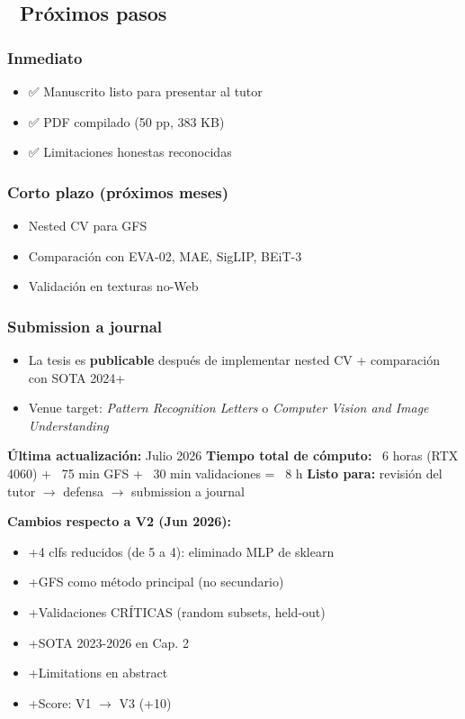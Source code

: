 \hrulefill

\subsection{📅 Próximos pasos}

\subsubsection{Inmediato}
\begin{itemize}
  \item ✅ Manuscrito listo para presentar al tutor
  \item ✅ PDF compilado (50 pp, 383 KB)
  \item ✅ Limitaciones honestas reconocidas
\end{itemize}

\subsubsection{Corto plazo (próximos meses)}
\begin{itemize}
  \item Nested CV para GFS
  \item Comparación con EVA-02, MAE, SigLIP, BEiT-3
  \item Validación en texturas no-Web
\end{itemize}

\subsubsection{Submission a journal}
\begin{itemize}
  \item La tesis es \textbf{publicable} después de implementar nested CV + comparación con SOTA 2024+
  \item Venue target: \textit{Pattern Recognition Letters} o \textit{Computer Vision and Image Understanding}
\end{itemize}

\hrulefill

\textbf{Última actualización:} Julio 2026
\textbf{Tiempo total de cómputo:} ~6 horas (RTX 4060) + ~75 min GFS + ~30 min validaciones = ~8 h
\textbf{Listo para:} revisión del tutor $\rightarrow$ defensa $\rightarrow$ submission a journal

\hrulefill

\textbf{Cambios respecto a V2 (Jun 2026):}
\begin{itemize}
  \item +4 clfs reducidos (de 5 a 4): eliminado MLP de sklearn
  \item +GFS como método principal (no secundario)
  \item +Validaciones CRÍTICAS (random subsets, held-out)
  \item +SOTA 2023-2026 en Cap. 2
  \item +Limitations en abstract
  \item +Score: V1 $\rightarrow$ V3 (+10)
\end{itemize}
